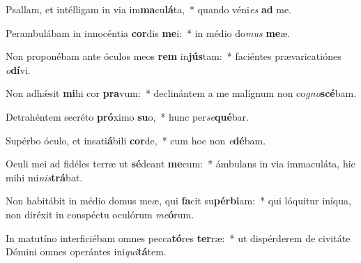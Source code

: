 \item Psallam, et intélligam in via im\textbf{ma}cu\textbf{lá}ta,~* quando véni\textit{es} \textbf{ad} me.
\item Perambulábam in innocéntia \textbf{cor}dis \textbf{me}i:~* in médio do\textit{mus} \textbf{me}æ.
\item Non proponébam ante óculos meos \textbf{rem} in\textbf{jús}tam:~* faciéntes prævaricatiónes \textit{o}\textbf{dí}vi.
\item Non adhǽsit \textbf{mi}hi cor \textbf{pra}vum:~* declinántem a me malígnum non co\textit{gno}\textbf{scé}bam.
\item Detrahéntem secréto \textbf{pró}ximo \textbf{su}o,~* hunc per\textit{se}\textbf{qué}bar.
\item Supérbo óculo, et insati\textbf{á}bili \textbf{cor}de,~* cum hoc non \textit{e}\textbf{dé}bam.
\item Oculi mei ad fidéles terræ ut \textbf{sé}deant \textbf{me}cum:~* ámbulans in via immaculáta, hic mihi mi\textit{nis}\textbf{trá}bat.
\item Non habitábit in médio domus meæ, qui \textbf{fa}cit su\textbf{pér}\textbf{bi}am:~* qui lóquitur iníqua, non diréxit in conspéctu oculórum \textit{me}\textbf{ó}rum.
\item In matutíno interficiébam omnes pecca\textbf{tó}res \textbf{ter}ræ:~* ut dispérderem de civitáte Dómini omnes operántes ini\textit{qui}\textbf{tá}tem.

